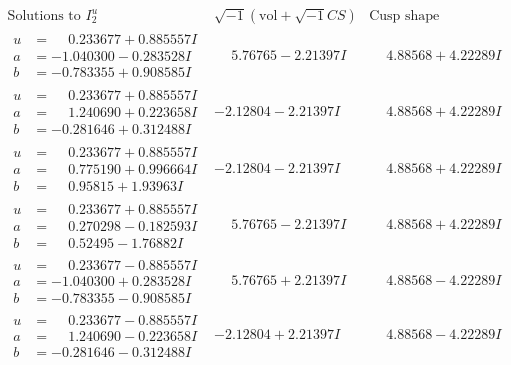 \documentclass[1p]{elsarticle_modified}
\theoremstyle{definition}
\newcommand{\I}{\sqrt{-1}}
\begin{document}
$$\begin{array}{c|c|c}  
\text{Solutions to }I^u_{2}& \I (\text{vol} + \sqrt{-1}CS) & \text{Cusp shape}\\
 \hline 
\begin{aligned}
u &= \phantom{-}0.233677 + 0.885557 I \\
a &= -1.040300 - 0.283528 I \\
b &= -0.783355 + 0.908585 I\end{aligned}
 & \phantom{-}5.76765 - 2.21397 I & \phantom{-}4.88568 + 4.22289 I \\ \hline\begin{aligned}
u &= \phantom{-}0.233677 + 0.885557 I \\
a &= \phantom{-}1.240690 + 0.223658 I \\
b &= -0.281646 + 0.312488 I\end{aligned}
 & -2.12804 - 2.21397 I & \phantom{-}4.88568 + 4.22289 I \\ \hline\begin{aligned}
u &= \phantom{-}0.233677 + 0.885557 I \\
a &= \phantom{-}0.775190 + 0.996664 I \\
b &= \phantom{-}0.95815 + 1.93963 I\end{aligned}
 & -2.12804 - 2.21397 I & \phantom{-}4.88568 + 4.22289 I \\ \hline\begin{aligned}
u &= \phantom{-}0.233677 + 0.885557 I \\
a &= \phantom{-}0.270298 - 0.182593 I \\
b &= \phantom{-}0.52495 - 1.76882 I\end{aligned}
 & \phantom{-}5.76765 - 2.21397 I & \phantom{-}4.88568 + 4.22289 I \\ \hline\begin{aligned}
u &= \phantom{-}0.233677 - 0.885557 I \\
a &= -1.040300 + 0.283528 I \\
b &= -0.783355 - 0.908585 I\end{aligned}
 & \phantom{-}5.76765 + 2.21397 I & \phantom{-}4.88568 - 4.22289 I \\ \hline\begin{aligned}
u &= \phantom{-}0.233677 - 0.885557 I \\
a &= \phantom{-}1.240690 - 0.223658 I \\
b &= -0.281646 - 0.312488 I\end{aligned}
 & -2.12804 + 2.21397 I & \phantom{-}4.88568 - 4.22289 I \\ \hline\begin{aligned}

\end{aligned}
\end{array}$$
\end{document}

